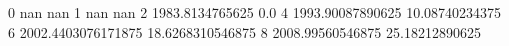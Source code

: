 0 nan nan
1 nan nan
2 1983.8134765625 0.0
4 1993.90087890625 10.08740234375
6 2002.4403076171875 18.6268310546875
8 2008.99560546875 25.18212890625
